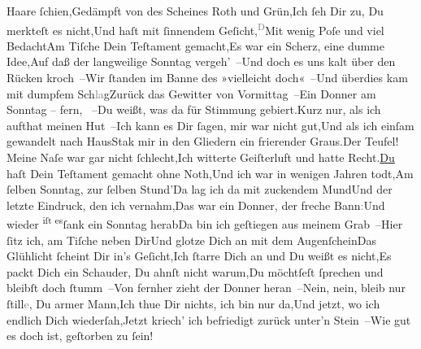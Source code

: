 \begin{ledgroupsized}[t]{13cm}
                  Haare ſchien,\newverse{}Gedämpft von des Scheines Roth und Grün,\newverse{}Ich ſeh Dir zu, Du merkteſt es nicht,\newverse{}Und haſt mit ſinnendem Geſicht,\newverse{}\substVorne{}\textsuperscript{\textcolor{gray}{D}}\substDazwischen{}M\substHinten{}it wenig Poſe und viel Bedacht\newverse{}Am Tiſche Dein Teſtament gemacht,\newverse{}Es war ein Scherz, eine dumme Idee,\newverse{}Auf daß der langweilige Sonntag vergeh’ –\newverse{}Und doch es uns kalt über den Rücken kroch –\newverse{}Wir ſtanden im Banne des »vielleicht doch« –\newverse{}Und überdies kam mit dumpfem Sch\textcolor{gray}{la}g\newverse{}Zurück das Gewitter von Vormittag –\newverse{}Ein Donner am Sonntag – fern, \label{K_L02647-2v}\label{K_L02647-2h} –\newverse{}Du weißt, was da für Stimmung gebiert.\newverse{}{\pb}Kurz nur, als ich aufthat meinen Hut –\newverse{}Ich kann es Dir ſagen, mir war nicht gut,\newverse{}Und als ich einſam gewandelt nach Haus\newverse{}Stak mir in den Gliedern ein frierender Graus.\newverse{}Der Teufel! Meine Naſe war gar nicht ſchlecht,\newverse{}Ich witterte Geiſterluft und hatte Recht.\newverse{}\uline{Du} haſt Dein Teſtament gemacht ohne Noth,\newverse{}Und ich war in wenigen Jahren todt,\newverse{}Am ſelben Sonntag, zur ſelben Stund’\newverse{}Da lag ich da mit zuckendem Mund\newverse{}Und der letzte Eindruck, den ich vernahm,\newverse{}Das war ein Donner, der freche Bann\textcolor{gray}{:}\newverse{}Und wieder \substVorne{}\textsuperscript{iſt es}{\allowbreak}\substDazwischen{}ſank\substHinten{} ein Sonntag herab\newverse{}Da bin ich geſtiegen aus meinem Grab –\newverse{}Hier ſitz ich, am Tiſche neben Dir\newverse{}Und glotze Dich an mit dem Augenſchein\newverse{}Das Glühlicht ſcheint Dir in’s Geſicht,\newverse{}Ich ſtarre Dich an und Du weißt es nicht,\newverse{}{\pb}Es packt Dich ein Schauder, Du  ahnſt nicht warum,\newverse{}Du möchtſeſt ſprechen und bleibſt doch ſtumm –\newverse{}Von fernher zieht der Donner heran –\newverse{}Nein, nein, bleib nur ſtill\textcolor{gray}{e}, Du armer Mann,\newverse{}Ich thue Dir nichts, ich bin nur da,\newverse{}Und jetzt, wo ich endlich Dich wiederſah,\newverse{}Jetzt kriech’ ich befriedigt zurück unter’n Stein –\newverse{}Wie gut es doch ist, geſtorben zu ſein!\stanzaend{}
         
         \endnumbering{}\end{ledgroupsized}  \newcommand{\dateiname}{L02647}\newcommand{\titel}{Paul Goldmann an Arthur Schnitzler, [27. 4. 1890]}\newcommand{\editorInnen}{Martin Anton Müller und Laura Untner}
      